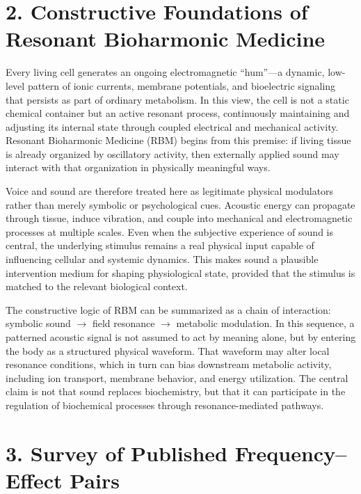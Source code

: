 \documentclass[11pt]{article}
\begin{document}
\section{2. Constructive Foundations of Resonant Bioharmonic Medicine}

Every living cell generates an ongoing electromagnetic ``hum''---a dynamic, low-level pattern of ionic currents, membrane potentials, and bioelectric signaling that persists as part of ordinary metabolism. In this view, the cell is not a static chemical container but an active resonant process, continuously maintaining and adjusting its internal state through coupled electrical and mechanical activity. Resonant Bioharmonic Medicine (RBM) begins from this premise: if living tissue is already organized by oscillatory activity, then externally applied sound may interact with that organization in physically meaningful ways.

Voice and sound are therefore treated here as legitimate physical modulators rather than merely symbolic or psychological cues. Acoustic energy can propagate through tissue, induce vibration, and couple into mechanical and electromagnetic processes at multiple scales. Even when the subjective experience of sound is central, the underlying stimulus remains a real physical input capable of influencing cellular and systemic dynamics. This makes sound a plausible intervention medium for shaping physiological state, provided that the stimulus is matched to the relevant biological context.

The constructive logic of RBM can be summarized as a chain of interaction: symbolic sound $\rightarrow$ field resonance $\rightarrow$ metabolic modulation. In this sequence, a patterned acoustic signal is not assumed to act by meaning alone, but by entering the body as a structured physical waveform. That waveform may alter local resonance conditions, which in turn can bias downstream metabolic activity, including ion transport, membrane behavior, and energy utilization. The central claim is not that sound replaces biochemistry, but that it can participate in the regulation of biochemical processes through resonance-mediated pathways.


\section{3. Survey of Published Frequency–Effect Pairs}
\end{document}
